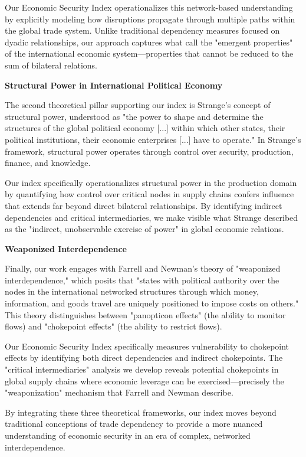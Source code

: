 \documentclass[final,1p,times,authoryear]{elsarticle}
\begin{document}
Our Economic Security Index operationalizes this network-based understanding by explicitly modeling how disruptions propagate through multiple paths within the global trade system. Unlike traditional dependency measures focused on dyadic relationships, our approach captures what \cite{oatley2013political} call the "emergent properties" of the international economic system—properties that cannot be reduced to the sum of bilateral relations.

\textbf{Structural Power in International Political Economy}

The second theoretical pillar supporting our index is Strange's \citeyear{strange1988states} concept of structural power, understood as "the power to shape and determine the structures of the global political economy [...] within which other states, their political institutions, their economic enterprises [...] have to operate." In Strange's framework, structural power operates through control over security, production, finance, and knowledge.

Our index specifically operationalizes structural power in the production domain by quantifying how control over critical nodes in supply chains confers influence that extends far beyond direct bilateral relationships. By identifying indirect dependencies and critical intermediaries, we make visible what Strange described as the "indirect, unobservable exercise of power" in global economic relations.

\textbf{Weaponized Interdependence}

Finally, our work engages with Farrell and Newman's \citeyear{farrell2019weaponized} theory of "weaponized interdependence," which posits that "states with political authority over the nodes in the international networked structures through which money, information, and goods travel are uniquely positioned to impose costs on others." This theory distinguishes between "panopticon effects" (the ability to monitor flows) and "chokepoint effects" (the ability to restrict flows).

Our Economic Security Index specifically measures vulnerability to chokepoint effects by identifying both direct dependencies and indirect chokepoints. The "critical intermediaries" analysis we develop reveals potential chokepoints in global supply chains where economic leverage can be exercised—precisely the "weaponization" mechanism that Farrell and Newman describe.

By integrating these three theoretical frameworks, our index moves beyond traditional conceptions of trade dependency to provide a more nuanced understanding of economic security in an era of complex, networked interdependence.
\end{document}
